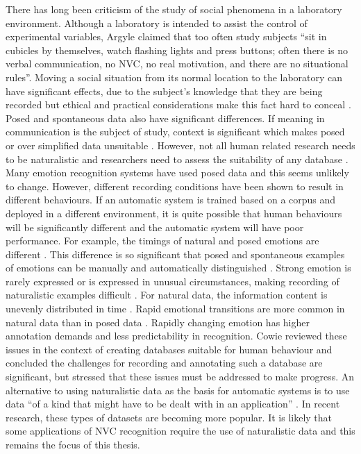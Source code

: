 


There has long been criticism of the study of social phenomena in a laboratory environment. Although a laboratory is intended to assist the control of experimental variables, Argyle \cite{Argyle1975} claimed that too often study subjects ``sit in cubicles by themselves, watch flashing lights and press buttons; often there is no verbal communication, no NVC, no real motivation, and there are no situational rules''. Moving a social situation from its normal location to the laboratory can have significant effects, due to the subject's knowledge that they are being recorded \cite{Beattie1982b} but ethical and practical considerations make this fact hard to conceal \cite{Frank2005}. Posed and spontaneous data also have significant differences. If meaning in communication is the subject of study, context is significant which makes posed or over simplified data unsuitable \cite{Bavelas97}. However, not all human related research needs to be naturalistic and researchers need to assess the suitability of any database \cite{DouglasCowie2003}. Many emotion recognition systems have used posed data and this seems unlikely to change. However, different recording conditions have been shown to result in different behaviours. If an automatic system is trained based on a corpus and deployed in a different environment, it is quite possible that human behaviours will be significantly different and the automatic system will have poor performance. For example, the timings of natural and posed emotions are different \cite{Cohn2004}. This difference is so significant that posed and spontaneous examples of emotions can be manually and automatically distinguished \cite{Valstar2006, Pfister2011b}. Strong emotion is rarely expressed or is expressed in unusual circumstances, making recording of naturalistic examples difficult \cite{Cowie2008}. For natural data, the information content is unevenly distributed in time \cite{Cowie2009}. Rapid emotional transitions are more common in natural data than in posed data \cite{McRorie2007, Bavelas97}. Rapidly changing emotion has higher annotation demands and less predictability in recognition. Cowie \cite{Cowie2008} reviewed these issues in the context of creating databases suitable for human behaviour and concluded the challenges for recording and annotating such a database are significant, but stressed that these issues must be addressed to make progress. An alternative to using naturalistic data as the basis for automatic systems is to use data ``of a kind that might have to be dealt with in an application'' \cite{Cowie2009b}. In recent research, these types of datasets are becoming more popular. It is likely that some applications of \ac{NVC} recognition require the use of naturalistic data and this remains the focus of this thesis. 
